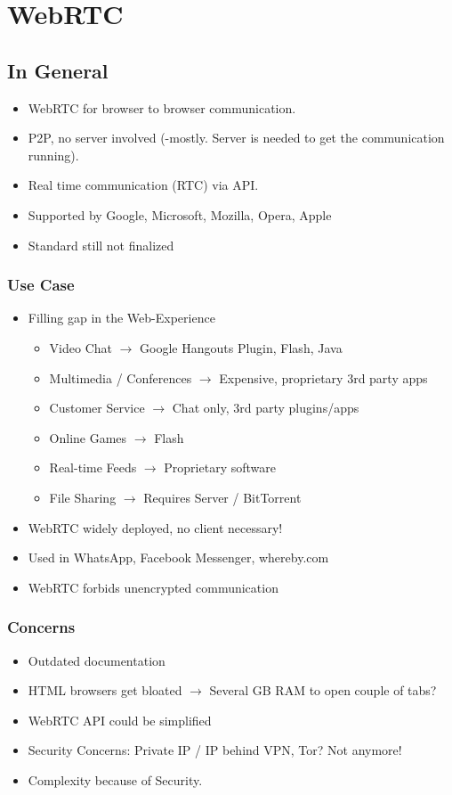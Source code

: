 \section{WebRTC}
\subsection{In General}
\begin{itemize}
  \item WebRTC for browser to browser communication.
  \item P2P, no server involved (-mostly. Server is needed to get the communication running).
  \item Real time communication (RTC) via API.
  \item Supported by Google, Microsoft, Mozilla, Opera, Apple
  \item Standard still not finalized
\end{itemize}

\subsubsection{Use Case}
\begin{itemize}
  \item Filling gap in the Web-Experience
  \begin{itemize}
    \item Video Chat $\rightarrow$ Google Hangouts Plugin, Flash, Java
    \item Multimedia / Conferences $\rightarrow$ Expensive, proprietary 3rd party apps
    \item Customer Service $\rightarrow$ Chat only, 3rd party plugins/apps
    \item Online Games $\rightarrow$ Flash
    \item Real-time Feeds $\rightarrow$ Proprietary software
    \item File Sharing $\rightarrow$ Requires Server / BitTorrent
  \end{itemize}
  \item WebRTC widely deployed, no client necessary!
  \item Used in WhatsApp, Facebook Messenger, whereby.com
  \item WebRTC forbids unencrypted communication
\end{itemize}

\subsubsection{Concerns}
\begin{itemize}
  \item Outdated documentation
  \item HTML browsers get bloated $\rightarrow$ Several GB RAM to open couple of tabs?
  \item WebRTC API could be simplified
  \item Security Concerns: Private IP / IP behind VPN, Tor? Not anymore!
  \item Complexity because of Security.
\end{itemize}

